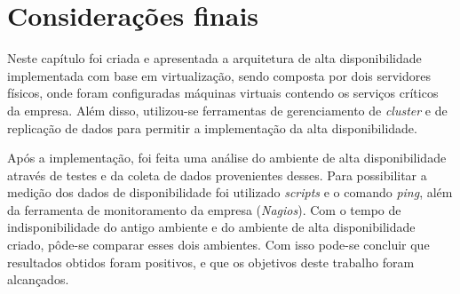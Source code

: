 \section{Considerações finais}

Neste capítulo foi criada e apresentada a arquitetura de alta disponibilidade implementada com base em virtualização, sendo composta por dois 
servidores físicos, onde foram configuradas máquinas virtuais contendo os serviços críticos da empresa. Além disso, utilizou-se ferramentas de 
gerenciamento de \textit{cluster} e de replicação de dados para permitir a implementação da alta disponibilidade.

Após a implementação, foi feita uma análise do ambiente de alta disponibilidade através de testes e da coleta de dados provenientes desses. 
Para possibilitar a medição dos dados de disponibilidade foi utilizado \textit{scripts} e o comando \textit{ping}, além da ferramenta de 
monitoramento da empresa (\textit{Nagios}). Com o tempo de indisponibilidade do antigo ambiente e do ambiente de alta disponibilidade criado,
pôde-se comparar esses dois ambientes.
Com isso pode-se concluir que resultados obtidos foram positivos, e que os objetivos deste trabalho foram alcançados. 

